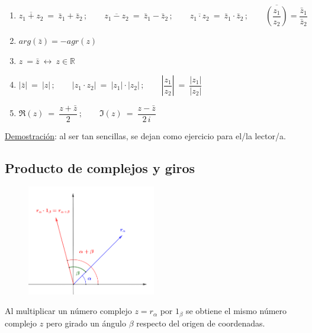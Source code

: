 \begin{theorem}
	
	\begin{enumerate}
	\item $\overline{z_1+z_2} \ = \ \bar z_1 + \bar z_2\, ; \qquad \overline{z_1-z_2}	\ = \ \bar z_1 - \bar z_2\, ; \qquad \overline{z_1\cdot z_2}	\ = \ \bar z_1 \cdot \bar z_2\, ; \qquad \overline{\left( \dfrac {z_1}{z_2} \right) }= \dfrac{\bar z_1}{\bar z_2}$
	\item $arg(\bar z)=-agr(z)$	
	\item $z\ = \bar z \ \leftrightarrow \ z\in \mathbb R$
	\item $|\bar z|\ = \ |z|\, ; \qquad |z_1\cdot z_2|\ = \ |z_1|\cdot |z_2|\, ; \qquad \left| \dfrac {z_1}{z_2} \right| \ = \ \dfrac {|z_1|}{|z_2|}$	
	\item $\Re(z) \ = \ \dfrac{z+\bar z}{2} \, ; \qquad \Im(z) \ = \ \dfrac{z-\bar z}{2\, i} $
	\end{enumerate}

\end{theorem}

\underline{Demostración}: al ser tan sencillas, se dejan como ejercicio para el/la lector/a.


\vspace{5mm}
\subsection{Producto de complejos y giros}

\vspace{5mm}
	
\begin{figure}[H]
	\centering
	\includegraphics[width=0.5\textwidth]{img-c/comp09.png}
\end{figure}
\vspace{2mm} Al multiplicar un número complejo $z=r_\alpha$ por $1_\beta$ se obtiene el mismo número complejo $z$ pero girado un ángulo $\beta$ respecto del origen de coordenadas.

